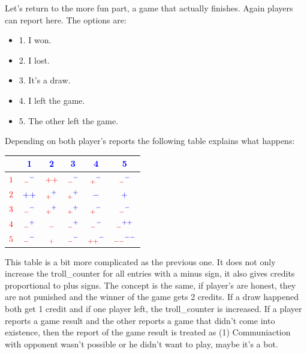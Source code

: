 \documentclass{article}
\begin{document}
%
Let's return to the more fun part, a game that actually finishes. Again players can report here. The options are:
%
\begin{itemize}
	\item 1. I won.
	\item 2. I lost.
	\item 3. It's a draw.
	\item 4. I left the game.
	\item 5. The other left the game.
\end{itemize}
%
Depending on both player's reports the following table explains what happens:
%
\begin{center}
	\begin{tabular}{ c | c | c | c | c | c}
		 & \textcolor{blue}{1} & \textcolor{blue}{2} & \textcolor{blue}{3} & \textcolor{blue}{4} & \textcolor{blue}{5} \\ \hline
		$\textcolor{red}{1}$ & $\textcolor{red}{{}_-} \textcolor{blue}{{}^-} $ & $\textcolor{red}{++} $ & $\textcolor{red}{{}_-} \textcolor{blue}{{}^-}$ & $\textcolor{red}{{}_+} \textcolor{blue}{{}^-}$ & $\textcolor{red}{{}_-} \textcolor{blue}{{}^-}$ \\ \hline
		$\textcolor{red}{2}$ & $\textcolor{blue}{++}$ & $\textcolor{red}{{}_+} \textcolor{blue}{{}^+}$  & $\textcolor{red}{{}_+} \textcolor{blue}{{}^+}$ & $\textcolor{blue}{-}$ & $\textcolor{blue}{+}$ \\ \hline
		$\textcolor{red}{3}$ & $\textcolor{red}{{}_-} \textcolor{blue}{{}^-}$ & $\textcolor{red}{{}_+} \textcolor{blue}{{}^+}$ & $\textcolor{red}{{}_+} \textcolor{blue}{{}^+}$ & $\textcolor{red}{{}_+} \textcolor{blue}{{}^-}$ & $\textcolor{red}{{}_-} \textcolor{blue}{{}^-}$ \\ \hline
		$\textcolor{red}{4}$ &  $\textcolor{red}{{}_-} \textcolor{blue}{{}^+}$  &  $\textcolor{red}{{}_-}$  & $\textcolor{red}{{}_-} \textcolor{blue}{{}^+}$ & $\textcolor{red}{{}_-} \textcolor{blue}{{}^-}$ & $\textcolor{red}{{}_{-}} \textcolor{blue}{{}^{++}}$ \\ \hline
		$\textcolor{red}{5}$ & $\textcolor{red}{{}_-} \textcolor{blue}{{}^-}$ & $\textcolor{red}{{}_+} $ & $\textcolor{red}{{}_-} \textcolor{blue}{{}^-}$ & $\textcolor{red}{{}_{++}} \textcolor{blue}{{}^-}$ & $\textcolor{red}{{}_{--}} \textcolor{blue}{{}^{--}}$ \\
	\end{tabular}
\end{center}
%
This table is a bit more complicated as the previous one. It does not only increase the troll\_counter for all entries with a minus sign, it also gives credits proportional to plus signs. The concept is the same, if player's are honest, they are not punished and the winner of the game gets 2 credits. If a draw happened both get 1 credit and if one player left, the troll\_counter is increased. If a player reports a game result and the other reports a game that didn't come into existence, then the report of the game result is treated as (1) Communiaction with opponent wasn't possible or he didn't want to play, maybe it's a bot. 
%
\end{document}
